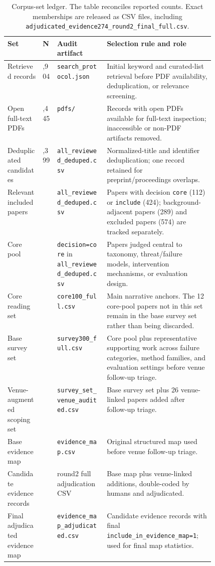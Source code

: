 \begin{table}[t]
\centering
\scriptsize
\renewcommand{\arraystretch}{0.92}
\begin{tabularx}{\linewidth}{>{\raggedright\arraybackslash}p{0.17\linewidth}>{\raggedleft\arraybackslash}p{0.07\linewidth}>{\raggedright\arraybackslash}p{0.24\linewidth}X}
\toprule
\textbf{Set} & \textbf{N} & \textbf{Audit artifact} & \textbf{Selection rule and role} \\
\midrule
Retrieved records & 1,904 & \texttt{search\_protocol.json} & Initial keyword and curated-list retrieval before PDF availability, deduplication, or relevance screening. \\
Open full-text PDFs & 1,445 & \texttt{pdfs/} & Records with open PDFs available for full-text inspection; inaccessible or non-PDF artifacts removed. \\
Deduplicated candidates & 1,399 & \texttt{all\_reviewed\_deduped.csv} & Normalized-title and identifier deduplication; one record retained for preprint/proceedings overlaps. \\
Relevant included papers & 536 & \texttt{all\_reviewed\_deduped.csv} & Papers with decision \texttt{core} (112) or \texttt{include} (424); background-adjacent papers (289) and excluded papers (574) are tracked separately. \\
Core pool & 112 & \texttt{decision=core} in \texttt{all\_reviewed\_deduped.csv} & Papers judged central to taxonomy, threat/failure models, intervention mechanisms, or evaluation design. \\
Core reading set & 100 & \texttt{core100\_full.csv} & Main narrative anchors. The 12 core-pool papers not in this set remain in the base survey set rather than being discarded. \\
Base survey set & 300 & \texttt{survey300\_full.csv} & Core pool plus representative supporting work across failure categories, method families, and evaluation settings before venue follow-up triage. \\
Venue-augmented scoping set & 326 & \texttt{survey\_set\_venue\_audited.csv} & Base survey set plus 26 venue-linked papers added after follow-up triage. \\
Base evidence map & 250 & \texttt{evidence\_map.csv} & Original structured map used before venue follow-up triage. \\
Candidate evidence records & 274 & round2 full adjudication CSV & Base map plus venue-linked additions, double-coded by humans and adjudicated. \\
Final adjudicated evidence map & 268 & \texttt{evidence\_map\_adjudicated.csv} & Candidate evidence records with final \texttt{include\_in\_evidence\_map=1}; used for final map statistics. \\
\bottomrule
\end{tabularx}
\caption{Corpus-set ledger. The table reconciles reported counts. Exact memberships are released as CSV files, including \texttt{adjudicated\_evidence274\_round2\_final\_full.csv}.}
\label{tab:set-selection-ledger}
\end{table}
